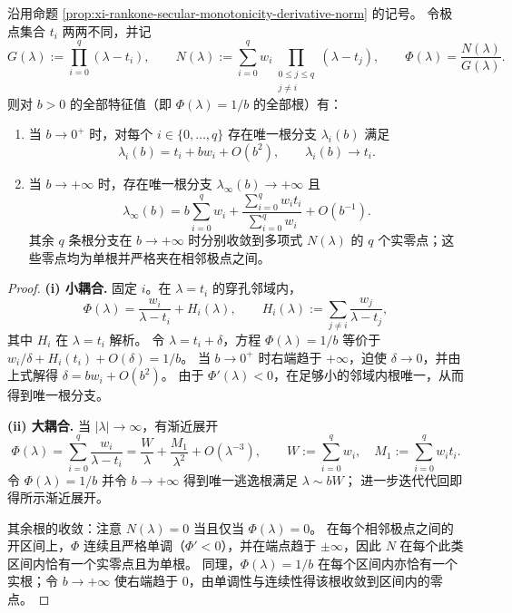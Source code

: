 \begin{theorem}\label{thm:xi-rankone-secular-small-large-coupling}
沿用命题 \ref{prop:xi-rankone-secular-monotonicity-derivative-norm} 的记号。
令极点集合 \(t_i\) 两两不同，并记
\[
G(\lambda):=\prod_{i=0}^{q}(\lambda-t_i),
\qquad
N(\lambda):=\sum_{i=0}^{q} w_i\!\!\prod_{\substack{0\le j\le q\\ j\ne i}}\!\!(\lambda-t_j),
\qquad
\Phi(\lambda)=\frac{N(\lambda)}{G(\lambda)}.
\]
则对 \(b>0\) 的全部特征值（即 \(\Phi(\lambda)=1/b\) 的全部根）有：
\begin{enumerate}
  \item 当 \(b\to 0^+\) 时，对每个 \(i\in\{0,\dots,q\}\) 存在唯一根分支 \(\lambda_i(b)\) 满足
  \[
  \lambda_i(b)=t_i+bw_i+O(b^2),
  \qquad
  \lambda_i(b)\to t_i.
  \]
  \item 当 \(b\to+\infty\) 时，存在唯一根分支 \(\lambda_\infty(b)\to+\infty\) 且
  \[
  \lambda_\infty(b)=b\sum_{i=0}^{q}w_i+\frac{\sum_{i=0}^{q}w_it_i}{\sum_{i=0}^{q}w_i}+O(b^{-1}).
  \]
  其余 \(q\) 条根分支在 \(b\to+\infty\) 时分别收敛到多项式 \(N(\lambda)\) 的 \(q\) 个实零点；这些零点均为单根并严格夹在相邻极点之间。
\end{enumerate}
\end{theorem}
\begin{proof}
\par\noindent\textbf{(i) 小耦合.}
固定 \(i\)。在 \(\lambda=t_i\) 的穿孔邻域内，
\[
\Phi(\lambda)=\frac{w_i}{\lambda-t_i}+H_i(\lambda),
\qquad
H_i(\lambda):=\sum_{j\ne i}\frac{w_j}{\lambda-t_j},
\]
其中 \(H_i\) 在 \(\lambda=t_i\) 解析。
令 \(\lambda=t_i+\delta\)，方程 \(\Phi(\lambda)=1/b\) 等价于
\(
w_i/\delta+H_i(t_i)+O(\delta)=1/b
\)。
当 \(b\to 0^+\) 时右端趋于 \(+\infty\)，迫使 \(\delta\to 0\)，并由上式解得
\(\delta=bw_i+O(b^2)\)。
由于 \(\Phi'(\lambda)<0\)，在足够小的邻域内根唯一，从而得到唯一根分支。
\par
\noindent\textbf{(ii) 大耦合.}
当 \(|\lambda|\to\infty\)，有渐近展开
\[
\Phi(\lambda)=\sum_{i=0}^{q}\frac{w_i}{\lambda-t_i}
=\frac{W}{\lambda}+\frac{M_1}{\lambda^2}+O(\lambda^{-3}),
\qquad
W:=\sum_{i=0}^{q}w_i,\quad M_1:=\sum_{i=0}^{q}w_it_i.
\]
令 \(\Phi(\lambda)=1/b\) 并令 \(b\to+\infty\) 得到唯一逃逸根满足 \(\lambda\sim bW\)；
进一步迭代代回即得所示渐近展开。
\par
其余根的收敛：注意 \(N(\lambda)=0\) 当且仅当 \(\Phi(\lambda)=0\)。
在每个相邻极点之间的开区间上，\(\Phi\) 连续且严格单调（\(\Phi'<0\)），并在端点趋于 \(\pm\infty\)，因此 \(N\) 在每个此类区间内恰有一个实零点且为单根。
同理，\(\Phi(\lambda)=1/b\) 在每个区间内亦恰有一个实根；令 \(b\to+\infty\) 使右端趋于 \(0\)，由单调性与连续性得该根收敛到区间内的零点。
\end{proof}

\endinput
